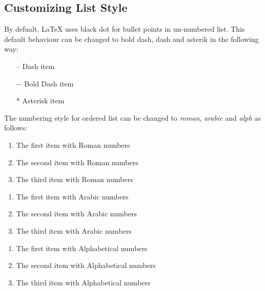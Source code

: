\documentclass[12pt, letter]{article}
\begin{document}
\subsection{Customizing List Style}

By defualt, LaTeX uses black dot for bullet points in un-numbered list. This default behaviour can be changed to bold dash, dash and asterik in the following way:

\begin{itemize}
	\item[--] Dash item
    \item[$-$] Bold Dash item
    \item[$\ast$] Asterisk item
\end{itemize}

The numbering style for ordered list can be changed to \textit{roman}, \textit{arabic} and \textit{alph} as follows:

\begin{enumerate}[label=\roman*]
  \item The first item with Roman numbers
  \item The second item with Roman numbers
  \item The third item with Roman numbers
\end{enumerate}

\begin{enumerate}[label=(\arabic*)]
  \item The first item with Arabic numbers
  \item The second item with Arabic numbers
   \item The third item with Arabic numbers
\end{enumerate}

\begin{enumerate}[label=(\alph*)]
  \item The first item with Alphabetical numbers
  \item The second item with Alphabetical numbers
   \item The third item with Alphabetical numbers
\end{enumerate}
\end{document}
